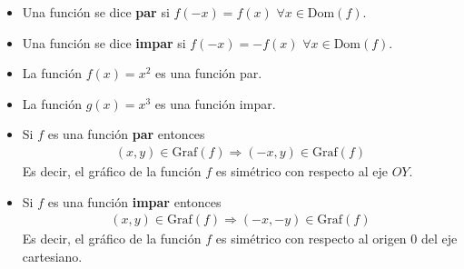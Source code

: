 \documentclass[12pt]{book}
\begin{document}
\begin{defi}{}{}
  \begin{itemize}
      \item   Una función se dice \textbf{par} si $f(-x)=f(x)$ $\forall x \in \text{Dom}(f)$.

      \item Una función se dice \textbf{impar} si $f(-x)=-f(x)$ $\forall x \in \text{Dom}(f)$.
  \end{itemize}
\end{defi}

\begin{eje}{}{}
    \begin{itemize}
        \item La función $f(x)=x^2$ es una función par.

        \item La función $g(x)=x^3$ es una función impar.
    \end{itemize}
\end{eje}

\begin{prop}{}{}
    \begin{itemize}
        \item Si $f$ es una función \textbf{par} entonces
        \begin{align*}
            (x,y) \in \text{Graf}(f) \Longrightarrow (-x,y) \in  \text{Graf}(f)
        \end{align*}
        Es decir, el gráfico de la función $f$ es simétrico con respecto al eje $OY$.

        \item Si $f$ es una función \textbf{impar} entonces
        \begin{align*}
            (x,y) \in \text{Graf}(f) \Longrightarrow (-x,-y) \in  \text{Graf}(f)
        \end{align*}
        Es decir, el gráfico de la función $f$ es simétrico con respecto al origen $0$ del eje cartesiano.
    \end{itemize}
\end{prop}
\end{document}
